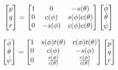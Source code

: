 $$ \begin{bmatrix} p \\ q \\ r \end{bmatrix} = \begin{bmatrix}
    1 & 0 & -s(\theta)\\
    0 & c(\phi) & s(\phi)c(\theta)\\
    0 & -s(\phi) & c(\phi)c(\theta) \end{bmatrix}  \begin{bmatrix} \dot{\phi} \\ \dot{\theta} \\ \dot{\psi} \end{bmatrix}$$

$$ \begin{bmatrix} \dot{\phi} \\ \dot{\theta} \\ \dot{\psi} \end{bmatrix} = \begin{bmatrix}
    1 & s(\phi)t(\theta) & c(\phi)t(\theta)\\
    0 & c(\phi) & -s(\phi)\\
    0 & \frac{s(\phi)}{c(\theta)} & \frac{c(\phi)}{c(\theta)} \end{bmatrix} \begin{bmatrix} p \\ q \\ r \end{bmatrix} $$
